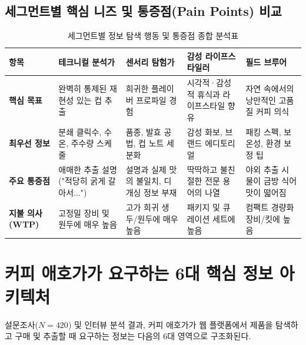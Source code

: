 \documentclass[10pt,a4paper]{article}
\begin{document}
\subsection{세그먼트별 핵심 니즈 및 통증점(Pain Points) 비교}

\begin{table}[h!]
\centering
\footnotesize
\caption{세그먼트별 정보 탐색 행동 및 통증점 종합 분석표}
\vspace{4pt}
\begin{tabularx}{\textwidth}{lXXXX}
\toprule
\textbf{항목} & \textbf{테크니컬 분석가} & \textbf{센서리 탐험가} & \textbf{감성 라이프스타일러} & \textbf{필드 브루어} \\
\midrule
\textbf{핵심 목표} & 완벽히 통제된 재현성 있는 컵 추출 & 희귀한 플레이버 프로파일 경험 & 시각적·감성적 휴식과 라이프스타일 향유 & 자연 속에서의 낭만적인 고품질 커피 의식 \\
\textbf{최우선 정보} & 분쇄 클릭수, 수온, 주수량 스케줄 & 품종, 발효 공법, 컵 노트 세분화 & 감성 화보, 브랜드 에디토리얼 & 패킹 스펙, 보온성, 환경 보정 팁 \\
\textbf{주요 통증점} & 애매한 추출 설명 ("적당히 굵게 갈아서...") & 설명과 실제 맛의 불일치, 디개싱 정보 부재 & 딱딱하고 불친절한 전문 용어의 나열 & 야외 추출 시 물이 금방 식어 맛이 떫어짐 \\
\textbf{지불 의사 (WTP)} & 고정밀 장비 및 원두에 매우 높음 & 고가 희귀 생두/원두에 매우 높음 & 패키지 및 큐레이션 세트에 높음 & 컴팩트 경량화 장비/킷에 높음 \\
\bottomrule
\end{tabularx}
\end{table}

\section{커피 애호가가 요구하는 6대 핵심 정보 아키텍처}

설문조사($N=420$) 및 인터뷰 분석 결과, 커피 애호가가 웹 플랫폼에서 제품을 탐색하고 구매 및 추출할 때 요구하는 정보는 다음의 6대 영역으로 구조화된다.
\end{document}
